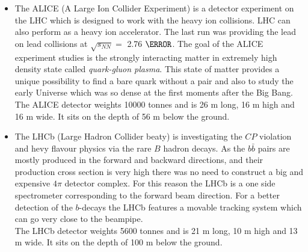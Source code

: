 \begin{itemize}
 \item The ALICE (A Large Ion Collider Experiment)\cite{ALICEtdr} is a detector experiment on the LHC which is designed to
 work with the heavy ion collisions. LHC can also perform as a heavy ion accelerator. The last run was providing
 the lead on lead collisions at $\sqrt{s_{NN}} =$ 2.76 $\TeV$. The goal of the ALICE experiment studies is
 the strongly interacting matter in extremely high density state called \textit{quark-gluon plasma}. This 
 state of matter provides a unique possibility to find a bare quark without a pair and also to study the early
 Universe which was so dense at the first moments after the Big Bang.
 \\
 The ALICE detector weights 10000 tonnes and is 26 m long, 16 m high and 16 m wide. It sits on the depth of
 56 m below the ground.
 
 \item The LHCb (Large Hadron Collider beaty)\cite{LHCb} is investigating the $CP$ violation and hevy flavour physics via
 the rare $B$ hadron decays. As the $b\bar{b}$ pairs are mostly produced in the forward and backward directions, 
 and their production cross section is very high there was no need to construct a big and expensive $4\pi$ detector 
 complex. For this reason the LHCb is a one side spectrometer corresponding to the forward beam direction.
 For a better detection of the $b$-decays the LHCb features a movable tracking system which can go very close
 to the beampipe.
 \\
 The LHCb detector weights 5600 tonnes and is 21 m long, 10 m high and 13 m wide. It sits on the depth of 100 m 
 below the ground.
 
 
 
\end{itemize}

% 
